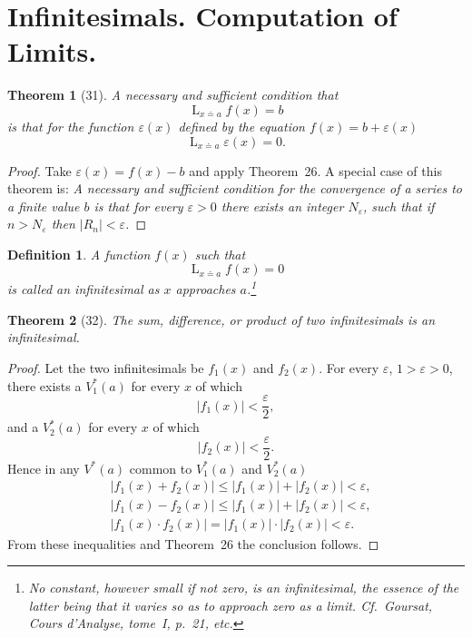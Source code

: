 \documentclass[a4paper,12pt]{book}[2004/02/16]
\providecommand{\leqq}{\leq}
\providecommand{\hyperlink}[2]{#2}
\providecommand{\hypertarget}[2]{#2}
\theoremstyle{ilemma}
\theoremstyle{itheorem}
\newtheorem{theorem}{Theorem}
\theoremstyle{iother}
\theoremstyle{icorollary}
\theoremstyle{numcorollary}
\theoremstyle{idefinition}
\newtheorem*{definition}{Definition}
\begin{document}
\section{Infinitesimals. Computation of Limits.}\hypertarget{chIVsec4}{}%

\begin{theorem}[31]\hypertarget{thm31}{}
A necessary and sufficient condition that
\[
  \mathop{L}_{x \doteq a} f(x) = b
\]
is that for the function $\varepsilon(x)$ defined by the equation
$f(x)=b + \varepsilon(x)$
\[
  \mathop{L}_{x \doteq a} \varepsilon(x) =0.
\]
\end{theorem}
\begin{proof}
Take $\varepsilon(x)=f(x)-b$ and apply Theorem~\hyperlink{thm26}{26}. A special case of
this theorem is: \textit{A necessary and sufficient condition for the
convergence of a series to a finite value $b$ is that for every
$\varepsilon>0$ there exists an integer $N_\varepsilon$, such that if
$n>N_\varepsilon$ then $|R_n|< \varepsilon$.}
\end{proof}

\begin{definition}\label{dp75}A function $f(x)$ such that
\[
  \mathop{L}_{x \doteq a} f(x)=0
\]
is called an \textit{infinitesimal} as $x$ approaches $a$.\footnote{%
  No constant, however small if not zero, is an infinitesimal, the
  essence of the latter being that it varies so as to approach zero as
  a limit. Cf.\ Goursat, Cours d'Analyse, tome~I, p.~21, etc.}
\end{definition}

\begin{theorem}[32]\hypertarget{thm32}{}
The sum, difference, or product of two infinitesimals is an
infinitesimal.
\end{theorem}

\begin{proof}
Let the two infinitesimals be $f_1(x)$ and $f_2(x)$. For every
$\varepsilon$, $1> \varepsilon >0$, there exists a $V_1^*(a)$ for
every $x$ of which
\[
  |f_1(x)|< \frac\varepsilon2,
\]
and a $V_2^*(a)$ for every $x$ of which
\[
  |f_2(x)|< \frac\varepsilon2.
\]
Hence in any $V^*(a)$ common to $V_1^*(a)$ and $V_2^*(a)$
\begin{align*}
& |f_1(x) + f_2(x)|\leqq
  |f_1(x)|+ |f_2(x)|< \varepsilon,
\\
& |f_1(x)-f_2(x)|\leqq
  |f_1(x)|+ |f_2(x)|< \varepsilon,
\\
& |f_1(x) \cdot f_2(x)|=
  |f_1(x)|\cdot|f_2(x)|< \varepsilon.
\end{align*}
From these inequalities and Theorem~\hyperlink{thm26}{26} the conclusion follows.
\end{proof}
\end{document}
